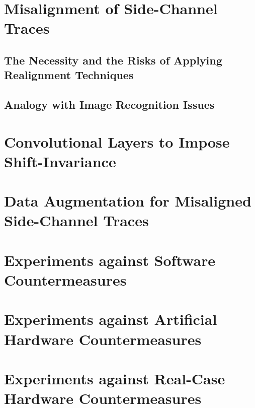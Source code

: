 \section{Misalignment of Side-Channel Traces}

\subsection{The Necessity and the Risks of Applying Realignment Techniques}
\subsection{Analogy with Image Recognition Issues}


\section{Convolutional Layers to Impose Shift-Invariance}


\section{Data Augmentation for Misaligned Side-Channel Traces}

\section{Experiments against Software Countermeasures}



\section{Experiments against Artificial Hardware Countermeasures}\label{sec:hardware}%


\section{Experiments against Real-Case Hardware Countermeasures}